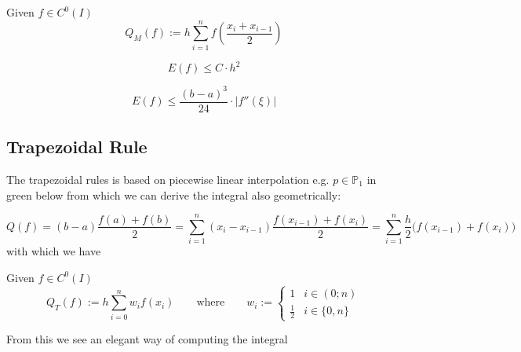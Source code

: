 \newpage

\begin{definition}
   Given \(f \in C^0(I)\)
   \[Q_M(f) := h \sum_{i=1}^n f\left(\frac{x_i + x_{i-1}}{2}\right)\]
\end{definition}


\begin{definition}
   \[E(f) \leq C \cdot h^2\]
\end{definition}

\begin{definition}
   \[E(f) \leq \frac{(b-a)^3}{24} \cdot |f''(\xi)|\]
\end{definition}

\subsection{Trapezoidal Rule}
The trapezoidal rules is based on piecewise linear interpolation e.g. \(p \in \mathbb{P}_1\) in green below
from which we can derive the integral also geometrically:
\begin{center}
   
\end{center}
\[Q(f) = (b-a) \frac{f(a) + f(b)}{2} = \sum_{i=1}^n (x_i - x_{i-1}) \frac{f(x_{i-1}) + f(x_i)}{2} = \sum_{i=1}^n \frac{h}{2} \big(f(x_{i-1}) + f(x_i)\big)\]
with which we have
\begin{definition}
   Given \(f \in C^0(I)\)
   \[Q_T(f) := h \sum_{i=0}^n w_i f(x_i) \qquad\text{where}\qquad w_i := \begin{cases} 1 & i \in (0; n)\\ \frac{1}{2} & i \in \{0, n\}\end{cases}\]
\end{definition}

From this we see an elegant way of computing the integral


